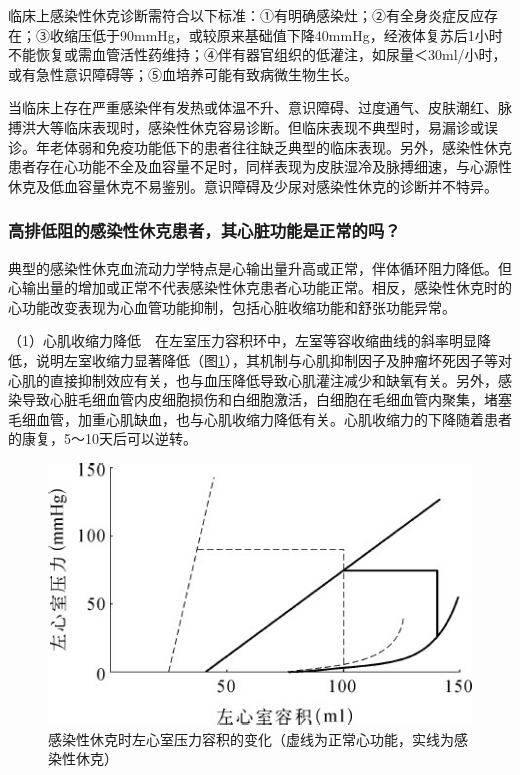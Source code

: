 临床上感染性休克诊断需符合以下标准：①有明确感染灶；②有全身炎症反应存在；③收缩压低于90mmHg，或较原来基础值下降40mmHg，经液体复苏后1小时不能恢复或需血管活性药维持；④伴有器官组织的低灌注，如尿量＜30ml/小时，或有急性意识障碍等；⑤血培养可能有致病微生物生长。

当临床上存在严重感染伴有发热或体温不升、意识障碍、过度通气、皮肤潮红、脉搏洪大等临床表现时，感染性休克容易诊断。但临床表现不典型时，易漏诊或误诊。年老体弱和免疫功能低下的患者往往缺乏典型的临床表现。另外，感染性休克患者存在心功能不全及血容量不足时，同样表现为皮肤湿冷及脉搏细速，与心源性休克及低血容量休克不易鉴别。意识障碍及少尿对感染性休克的诊断并不特异。

\subsubsection{高排低阻的感染性休克患者，其心脏功能是正常的吗？}

典型的感染性休克血流动力学特点是心输出量升高或正常，伴体循环阻力降低。但心输出量的增加或正常不代表感染性休克患者心功能正常。相反，感染性休克时的心功能改变表现为心血管功能抑制，包括心脏收缩功能和舒张功能异常。

（1）心肌收缩力降低　在左室压力容积环中，左室等容收缩曲线的斜率明显降低，说明左室收缩力显著降低（图\ref{fig2-1}），其机制与心肌抑制因子及肿瘤坏死因子等对心肌的直接抑制效应有关，也与血压降低导致心肌灌注减少和缺氧有关。另外，感染导致心脏毛细血管内皮细胞损伤和白细胞激活，白细胞在毛细血管内聚集，堵塞毛细血管，加重心肌缺血，也与心肌收缩力降低有关。心肌收缩力的下降随着患者的康复，5～10天后可以逆转。

\begin{figure}[!htbp]
 \centering
 \includegraphics{./images/Image00010.jpg}
 \captionsetup{justification=centering}
 \caption{感染性休克时左心室压力容积的变化（虚线为正常心功能，实线为感染性休克）}
 \label{fig2-1}
  \end{figure} 



